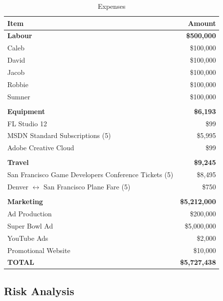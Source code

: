 \documentclass[12pt,titlepage]{article}
\newcommand\tab[1][.5in]{\hspace*{#1}}
\begin{document}
\begin{table}[H]
    \caption{Expenses}
    \label{tab:expenses}
    \centering
    \begin{tabular}{|l|r|}
        \hline
        \textbf{Item} & Amount \\
        \hline\hline
        \textbf{Labour} & \textbf{\$500,000} \\
        \tab Caleb & \$100,000 \\
        \tab David & \$100,000 \\
        \tab Jacob & \$100,000 \\
        \tab Robbie & \$100,000 \\
        \tab Sumner & \$100,000 \\
                    &\\
        \textbf{Equipment} & \textbf{\$6,193} \\
        \tab FL Studio 12 & \$99 \\
        \tab MSDN Standard Subscriptions (5) & \$5,995 \\
        \tab Adobe Creative Cloud & \$99 \\
                                  & \\
        \textbf{Travel} & \textbf{\$9,245} \\
        \tab San Francisco Game Developers Conference Tickets (5) & \$8,495 \\
        \tab Denver $\leftrightarrow$ San Francisco Plane Fare (5) & \$750 \\
                                                                   & \\
        \textbf{Marketing} & \textbf{\$5,212,000} \\
        \tab Ad Production & \$200,000 \\
        \tab Super Bowl Ad & \$5,000,000 \\
        \tab YouTube Ads & \$2,000 \\
        \tab Promotional Website & \$10,000 \\
        \hline\hline
        \textbf{TOTAL} & \textbf{\$5,727,438} \\
        \hline
    \end{tabular}
\end{table}

\subsection{Risk Analysis}
\end{document}
